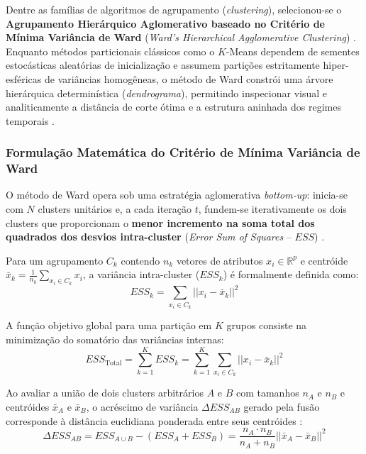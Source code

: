 \documentclass[10pt,twoside]{article}
\begin{document}
Dentre as famílias de algoritmos de agrupamento (\textit{clustering}), selecionou-se o \textbf{Agrupamento Hierárquico Aglomerativo baseado no Critério de Mínima Variância de Ward} (\textit{Ward's Hierarchical Agglomerative Clustering}) \cite{ref19}. Enquanto métodos particionais clássicos como o $K$-Means dependem de sementes estocásticas aleatórias de inicialização e assumem partições estritamente hiper-esféricas de variâncias homogêneas, o método de Ward constrói uma árvore hierárquica determinística (\textit{dendrograma}), permitindo inspecionar visual e analiticamente a distância de corte ótima e a estrutura aninhada dos regimes temporais \cite{ref7, ref19}.

\subsubsection{Formulação Matemática do Critério de Mínima Variância de Ward}
O método de Ward opera sob uma estratégia aglomerativa \textit{bottom-up}: inicia-se com $N$ clusters unitários e, a cada iteração $t$, fundem-se iterativamente os dois clusters que proporcionam o \textbf{menor incremento na soma total dos quadrados dos desvios intra-cluster} (\textit{Error Sum of Squares} -- $ESS$) \cite{ref19}. 

Para um agrupamento $C_k$ contendo $n_k$ vetores de atributos $x_i \in \mathbb{R}^p$ e centróide $\bar{x}_k = \frac{1}{n_k} \sum_{x_i \in C_k} x_i$, a variância intra-cluster ($ESS_k$) é formalmente definida como:
\begin{equation}
ESS_k = \sum_{x_i \in C_k} ||x_i - \bar{x}_k||^2
\end{equation}

A função objetivo global para uma partição em $K$ grupos consiste na minimização do somatório das variâncias internas:
\begin{equation}
ESS_{\text{Total}} = \sum_{k=1}^K ESS_k = \sum_{k=1}^K \sum_{x_i \in C_k} ||x_i - \bar{x}_k||^2
\end{equation}

Ao avaliar a união de dois clusters arbitrários $A$ e $B$ com tamanhos $n_A$ e $n_B$ e centróides $\bar{x}_A$ e $\bar{x}_B$, o acréscimo de variância $\Delta ESS_{AB}$ gerado pela fusão corresponde à distância euclidiana ponderada entre seus centróides \cite{ref19}:
\begin{equation}
\Delta ESS_{AB} = ESS_{A \cup B} - (ESS_A + ESS_B) = \frac{n_A \cdot n_B}{n_A + n_B} ||\bar{x}_A - \bar{x}_B||^2
\end{equation}
\end{document}
